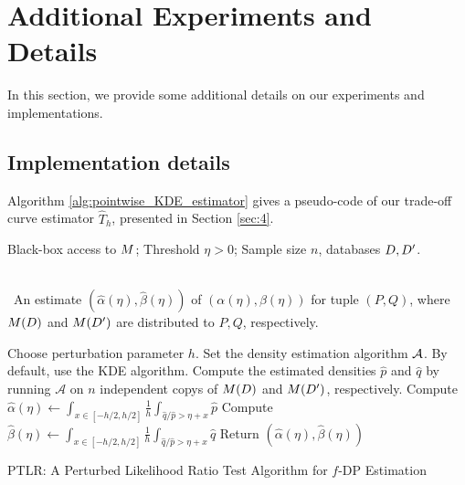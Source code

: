 \section{Additional Experiments and Details} \label{AppB}

In this section, we provide some additional details on our experiments and implementations.

\subsection{Implementation details}

Algorithm \ref{alg:pointwise_KDE_estimator} gives a pseudo-code of our trade-off curve estimator $\hat T_h$, presented in Section \ref{sec:4}. 

\begin{algorithm}[h]
\footnotesize
\algorithmicrequire \; \parbox[t]{\dimexpr0.9\linewidth-\algorithmicindent}{Black-box access to $M$; Threshold $\eta > 0$; Sample size $n$, databases $D, D'$.}\\[0.1cm]
\algorithmicensure \, An estimate $(\hat{\alpha}(\eta), \hat{\beta}(\eta))$ of $(\alpha(\eta), \beta(\eta))$ for tuple $(P, Q)$, where $M(D)$ and $M(D')$ are distributed to $P, Q$, respectively.
\begin{algorithmic}[1]
    \State Choose perturbation parameter $h$. 
    \State Set the density estimation algorithm $\mathcal{A}$. By default, use the KDE algorithm.
    \State Compute the estimated densities $\hat{p}$ and $\hat{q}$ by running $\mathcal{A}$ on $n$ independent copys of $M(D)$ and $M(D')$, respectively.
    \State Compute $\hat{\alpha}(\eta) \leftarrow \int_{x \in [-h/2,h/2]} \frac{1}{h}\int_{\hat q /\hat p  > \eta +x} \hat p$ 
    \State Compute $\hat{\beta}(\eta) \leftarrow \int_{x \in [-h/2,h/2]} \frac{1}{h}  \int_{\hat q /\hat p  > \eta +x} \hat q$ 
    \State Return $(\hat{\alpha}(\eta), \hat{\beta}(\eta))$
    \EndFunction
\end{algorithmic}
\caption{PTLR: A Perturbed Likelihood Ratio Test Algorithm for $f$-DP Estimation}
\label{alg:pointwise_KDE_estimator}
\end{algorithm}

